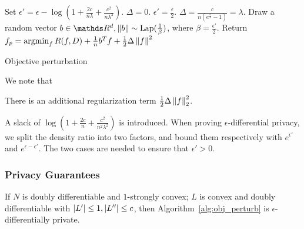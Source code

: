 \documentclass{article} %
\begin{document}
\begin{algorithm}[htb]
\begin{algorithmic}[1]
    \State Set $\epsilon' = \epsilon - \log{(1 + \frac{2c}{n\lambda} + \frac{c^2}{n\lambda^2})}$.
	\State $\Delta = 0$.
    \Else
	\State $\epsilon' = \frac{\epsilon}{2}$.
	\State $\Delta = \frac{c}{n(e^{\frac{\epsilon}{4}} - 1)} = \lambda$.
    \EndIf
    \State Draw a random vector $b\in \R^d, \norm{b}\sim \text{Lap}(\frac{1}{\beta})$, where $\beta = \frac{\epsilon'}{2}$.
    \State Return $f_{p} = \operatorname*{argmin}_f R(f, D) + \frac{1}{n} b^T f + \frac{1}{2}\Delta\left\lVert f\right\rVert^2 $
   \EndFunction
\end{algorithmic}
\caption{Objective perturbation}\label{alg:obj_perturb}
\end{algorithm}

We note that \begin{enumerate*}[label=(\roman*)]
\item There is an additional regularization term $\frac{1}{2}\Delta \left\lVert f\right\rVert_2^2$.
\item A slack of $\log{(1 + \frac{2c}{n} + \frac{c^2}{n^2\lambda^2})}$ is introduced. When proving $\epsilon$-differential privacy, we split the density ratio into two factors, and bound them respectively with $e^{\epsilon'}$ and $e^{\epsilon - \epsilon'}$. The two cases are needed to ensure that $\epsilon' > 0$.
\end{enumerate*}

\subsubsection{Privacy Guarantees}
\begin{theorem}
If $N$ is doubly differentiable and $1$-strongly convex; $L$ is convex and doubly differentiable with $\left\lvert L'\right\rvert \le 1, \left\lvert L''\right\rvert \le c$, then Algorithm~\ref{alg:obj_perturb} is $\epsilon$-differentially private.
\end{theorem}
\end{document}

